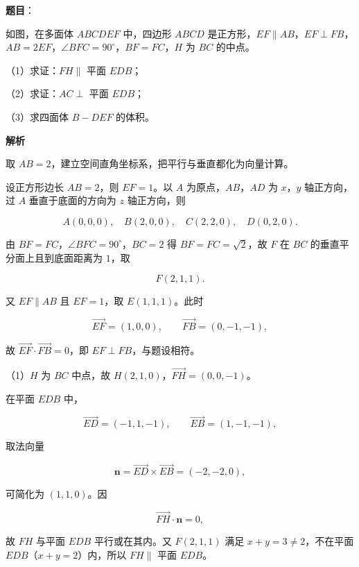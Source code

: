 \begin{answer}

\textbf{题目}：

如图，在多面体 $ABCDEF$ 中，四边形 $ABCD$ 是正方形，$EF\parallel AB$，$EF\perp FB$，$AB=2EF$，$\angle BFC=90^\circ$，$BF=FC$，$H$ 为 $BC$ 的中点。

（1）求证：$FH\parallel$ 平面 $EDB$；

（2）求证：$AC\perp$ 平面 $EDB$；

（3）求四面体 $B-DEF$ 的体积。
\nopagebreak[4]
\begin{center}\end{center}
\nopagebreak[4]
\textbf{解析}

取 $AB=2$，建立空间直角坐标系，把平行与垂直都化为向量计算。

设正方形边长 $AB=2$，则 $EF=1$。以 $A$ 为原点，$AB$，$AD$ 为 $x$，$y$ 轴正方向，过 $A$ 垂直于底面的方向为 $z$ 轴正方向，则

\nopagebreak[4]
\[A(0,0,0),\quad B(2,0,0),\quad C(2,2,0),\quad D(0,2,0).\]

由 $BF=FC$，$\angle BFC=90^\circ$，$BC=2$ 得 $BF=FC=\sqrt2$，故 $F$ 在 $BC$ 的垂直平分面上且到底面距离为 $1$，取

\nopagebreak[4]
\[F(2,1,1).\]

又 $EF\parallel AB$ 且 $EF=1$，取 $E(1,1,1)$。此时

\nopagebreak[4]
\[\overrightarrow{EF}=(1,0,0),\qquad \overrightarrow{FB}=(0,-1,-1),\]

故 $\overrightarrow{EF}\cdot\overrightarrow{FB}=0$，即 $EF\perp FB$，与题设相符。

（1）$H$ 为 $BC$ 中点，故 $H(2,1,0)$，$\overrightarrow{FH}=(0,0,-1)$。

在平面 $EDB$ 中，

\nopagebreak[4]
\[\overrightarrow{ED}=(-1,1,-1),\qquad \overrightarrow{EB}=(1,-1,-1),\]

取法向量

\nopagebreak[4]
\[\boldsymbol n=\overrightarrow{ED}\times\overrightarrow{EB}=(-2,-2,0),\]

可简化为 $(1,1,0)$。因

\nopagebreak[4]
\[\overrightarrow{FH}\cdot\boldsymbol n=0,\]

故 $FH$ 与平面 $EDB$ 平行或在其内。又 $F(2,1,1)$ 满足 $x+y=3\neq2$，不在平面 $EDB$（$x+y=2$）内，所以 $FH\parallel$ 平面 $EDB$。


\end{answer}
